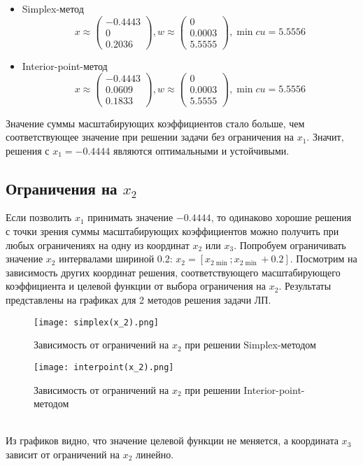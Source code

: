 \begin{itemize}
	\item Simplex-метод \\
	\begin{equation}
		x \approx
		\begin{pmatrix}
			-0.4443 \\
			0 \\
			0.2036
		\end{pmatrix}, w \approx \begin{pmatrix}
			0 \\
			0.0003 \\
			5.5555
		\end{pmatrix}, \min c u = 5.5556
	\end{equation}
	
	\item Interior-point-метод \\
	\begin{equation}
		x \approx
		\begin{pmatrix}
			-0.4443 \\
			0.0609 \\
			0.1833
		\end{pmatrix}, w \approx \begin{pmatrix}
			0 \\
			0.0003 \\
			5.5555
		\end{pmatrix}, \min c u = 5.5556
	\end{equation}
\end{itemize}
Значение суммы масштабирующих коэффициентов стало больше, чем соответствующее значение при решении задачи без ограничения на $x_1$. Значит, решения с $x_1=-0.4444$ являются оптимальными и устойчивыми.

\subsection{Ограничения на $x_2$}
Если позволить $x_1$ принимать значение $-0.4444$, то одинаково хорошие решения с точки зрения суммы масштабирующих коэффициентов можно получить при любых ограничениях на одну из координат $x_2$ или $x_3$. Попробуем ограничивать значение $x_2$ интервалами шириной 0.2: $x_2 = [x_{2 \min}; x_{2 \min} + 0.2]$. Посмотрим на зависимость других координат решения, соответствующего масштабирующего коэффициента и целевой функции от выбора ограничения на $x_2$. Результаты представлены на графиках для 2 методов решения задачи ЛП. \\
\begin{figure}[h]
	\centering
	\texttt{[image: simplex(x\_2).png]}
	\caption{Зависимость от ограничений на $x_2$ при решении Simplex-методом}
\end{figure}
\begin{figure}[h]
	\centering
	\texttt{[image: interpoint(x\_2).png]}
	\caption{Зависимость от ограничений на $x_2$ при решении Interior-point-методом}
\end{figure} \\
Из графиков видно, что значение целевой функции не меняется, а координата $x_3$ зависит от ограничений на $x_2$ линейно.

